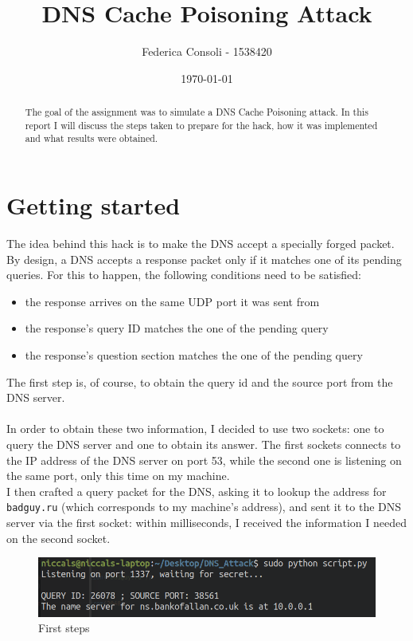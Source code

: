 \documentclass[a4paper]{article}
\title{DNS Cache Poisoning Attack}
\author{Federica Consoli - 1538420}
\date{\today}
\begin{document}
\maketitle

\begin{abstract}
	The goal of the assignment was to simulate a DNS Cache Poisoning attack. In this report I will discuss the steps taken to prepare for the hack, how it was implemented and what results were obtained.
\end{abstract}

\section{Getting started}
\label{sec:q1}
	The idea behind this hack is to make the DNS accept a specially forged packet. By design, a DNS accepts a response packet only if it matches one of its pending queries. For this to happen, the following conditions need to be satisfied:
	\begin{itemize}
		\item the response arrives on the same UDP port it was sent from
		\item the response's query ID matches the one of the pending query
		\item the response's question section matches the one of the pending query
	\end{itemize}
	The first step is, of course, to obtain the query id and the source port from the DNS server.
	\\\\
	In order to obtain these two information, I decided to use two sockets: one to query the DNS server and one to obtain its answer. The first sockets connects to the IP address of the DNS server on port 53, while the second one is listening on the same port, only this time on my machine. \\I then crafted a query packet for the DNS, asking it to lookup the address for \texttt{badguy.ru} (which corresponds to my machine's address), and sent it to the DNS server via the first socket: within milliseconds, I received the information I needed on the second socket.\\
	\begin{figure}
		\centering
		\includegraphics[width=1\linewidth]{qid_srcport}
		\caption[]{First steps}
		\label{fig:qidsrcport}
	\end{figure}
\end{document}
